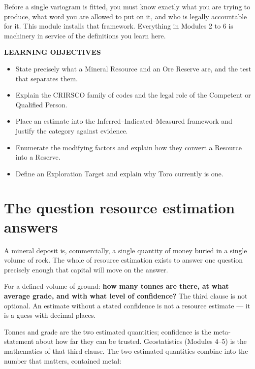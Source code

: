 \documentclass[11pt]{article}
\begin{document}

Before a single variogram is fitted, you must know exactly what you are
trying to produce, what word you are allowed to put on it, and who is
legally accountable for it. This module installs that framework.
Everything in Modules 2 to 6 is machinery in service of the definitions
you learn here.

\begin{objbox}
{\sffamily\bfseries\color{bronze}LEARNING OBJECTIVES}
\begin{itemize}[leftmargin=14pt,itemsep=2pt]
\item State precisely what a Mineral Resource and an Ore Reserve are, and
the test that separates them.
\item Explain the CRIRSCO family of codes and the legal role of the
Competent or Qualified Person.
\item Place an estimate into the Inferred--Indicated--Measured framework
and justify the category against evidence.
\item Enumerate the modifying factors and explain how they convert a
Resource into a Reserve.
\item Define an Exploration Target and explain why Toro currently is one.
\end{itemize}
\end{objbox}

\section{The question resource estimation answers}

A mineral deposit is, commercially, a single quantity of money buried in
a single volume of rock. The whole of resource estimation exists to
answer one question precisely enough that capital will move on the
answer.

\begin{keybox}
For a defined volume of ground: \textbf{how many tonnes are there, at
what average grade, and with what level of confidence?} The third clause
is not optional. An estimate without a stated confidence is not a
resource estimate --- it is a guess with decimal places.
\end{keybox}

Tonnes and grade are the two estimated quantities; confidence is the
meta-statement about how far they can be trusted. Geostatistics
(Modules 4--5) is the mathematics of that third clause. The two estimated
quantities combine into the number that matters, contained metal:
\end{document}
